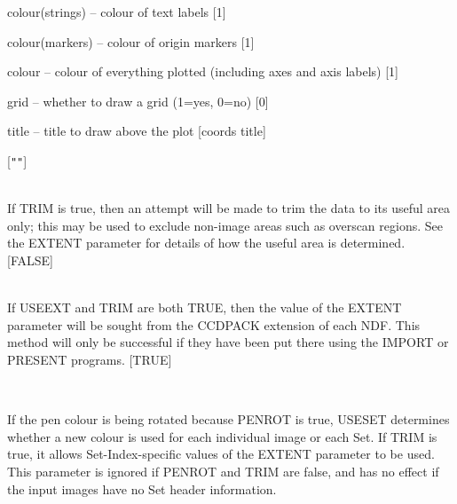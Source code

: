 \documentclass[twoside,11pt]{article}
\newcommand{\htmlref}[2]{#1}
\renewcommand{\_}{\texttt{\symbol{95}}}
\newcommand{\xroutine}[1]{\htmlref{{\sc #1}}{#1}}
\newcommand{\sstsubsection}[1]{ \item[{#1}] \mbox{} \\}
\newcommand{\sstitem}{\item}
\newcommand{\sstsubsection}[1]{\item[{#1}]}
\newcommand{\sstitem}{\item}
\begin{document}
{{{{            \sstitem
               colour(strings) -- colour of text labels [1]

            \sstitem
               colour(markers) -- colour of origin markers [1]

            \sstitem
               colour          -- colour of everything plotted
                                    (including axes and axis labels) [1]

            \sstitem
               grid            -- whether to draw a grid (1=yes, 0=no) [0]

            \sstitem
               title           -- title to draw above the plot [coords title]

         }
         [{\tt "}{\tt "}]
      }
      \sstsubsection{
         TRIM = \_LOGICAL (Read)
      }{
         If TRIM is true, then an attempt will be made to trim the data
         to its useful area only; this may be used to exclude non-image
         areas such as overscan regions.  See the EXTENT parameter for
         details of how the useful area is determined.
         [FALSE]
      }
      \sstsubsection{
         USEEXT = \_LOGICAL (Read)
      }{
         If USEEXT and TRIM are both TRUE, then the value of the EXTENT
         parameter will be sought from the CCDPACK extension of each
         NDF.  This method will only be successful if they have been
         put there using the \xroutine{IMPORT} or \xroutine{PRESENT} programs.
         [TRUE]
      }
      \sstsubsection{
         USESET = \_LOGICAL (Read)
      }{
         If the pen colour is being rotated because PENROT is true,
         USESET determines whether a new colour is used for each
         individual image or each Set.  If TRIM is true, it allows
         Set-Index-specific values of the EXTENT parameter to be
         used.  This parameter is ignored if PENROT and TRIM are
         false, and has no effect if the input images have no Set header
         information.

}}}
\end{document}
